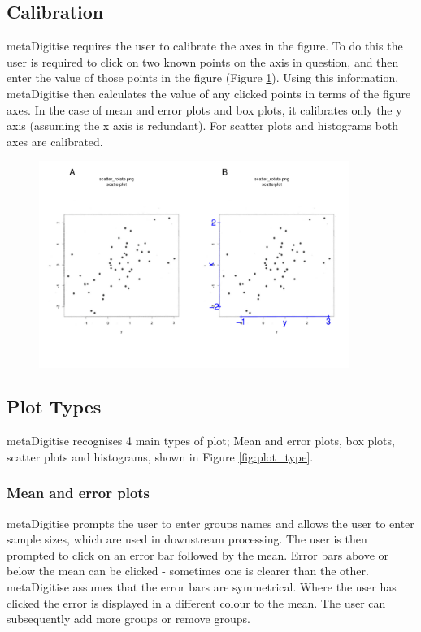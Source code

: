 \documentclass{article}
\begin{document}
\subsection{Calibration}
metaDigitise requires the user to calibrate the axes in the figure. To do this the user is required to click on two known points on the axis in question, and then enter the value of those points in the figure (Figure \ref{fig:calibrate}). Using this information, metaDigitise then calculates the value of any clicked points in terms of the figure axes. In the case of mean and error plots and box plots, it calibrates only the y axis (assuming the x axis is redundant). For scatter plots and histograms both axes are calibrated.


\begin{figure}[!h] 
 \includegraphics[width=0.9\textwidth]{fig_calibrate.pdf} 
 \caption{ }
\label{fig:calibrate}
\end{figure}

\subsection{Plot Types}
metaDigitise recognises 4 main types of plot; Mean and error plots, box plots, scatter plots and histograms, shown in Figure \ref{fig:plot_type}. 

\subsubsection{Mean and error plots} 
metaDigitise prompts the user to enter groups names and allows the user to enter sample sizes, which are used in downstream processing. The user is then prompted to click on an error bar followed by the mean. Error bars above or below the mean can be clicked - sometimes one is clearer than the other. metaDigitise assumes that the error bars are symmetrical. Where the user has clicked the error is displayed in a different colour to the mean. The user can subsequently add more groups or remove groups.
\end{document}
